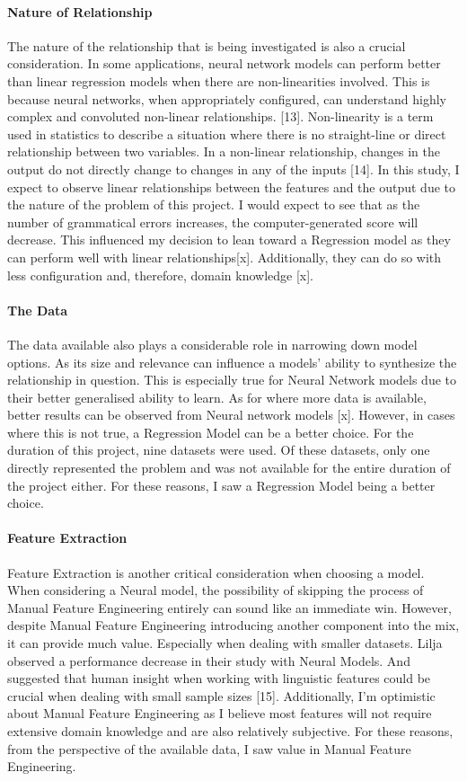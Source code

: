 \paragraph{Nature of Relationship}
The nature of the relationship that is being investigated is also a crucial consideration. In some applications, neural network models can perform better than linear regression models when there are non-linearities involved. This is because neural networks, when appropriately configured, can understand highly complex and convoluted non-linear relationships. [13]. Non-linearity is a term used in statistics to describe a situation where there is no straight-line or direct relationship between two variables. In a non-linear relationship, changes in the output do not directly change to changes in any of the inputs [14]. In this study, I expect to observe linear relationships between the features and the output due to the nature of the problem of this project. I would expect to see that as the number of grammatical errors increases, the computer-generated score will decrease. This influenced my decision to lean toward a Regression model as they can perform well with linear relationships[x]. Additionally, they can do so with less configuration and, therefore, domain knowledge [x].

\paragraph{The Data}
The data available also plays a considerable role in narrowing down model options. As its size and relevance can influence a models' ability to synthesize the relationship in question. This is especially true for Neural Network models due to their better generalised ability to learn. As for where more data is available, better results can be observed from Neural network models [x]. However, in cases where this is not true, a Regression Model can be a better choice. For the duration of this project, nine datasets were used. Of these datasets, only one directly represented the problem and was not available for the entire duration of the project either. For these reasons, I saw a Regression Model being a better choice.

\paragraph{Feature Extraction}
Feature Extraction is another critical consideration when choosing a model. When considering a Neural model, the possibility of skipping the process of Manual Feature Engineering entirely can sound like an immediate win. However, despite Manual Feature Engineering introducing another component into the mix, it can provide much value. Especially when dealing with smaller datasets. Lilja observed a performance decrease in their study with Neural Models. And suggested that human insight when working with linguistic features could be crucial when dealing with small sample sizes [15]. Additionally, I'm optimistic about Manual Feature Engineering as I believe most features will not require extensive domain knowledge and are also relatively subjective. For these reasons, from the perspective of the available data, I saw value in Manual Feature Engineering. 

